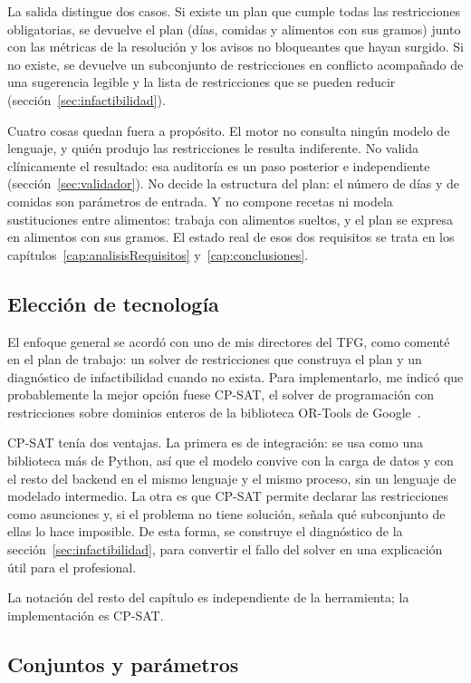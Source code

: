 La salida distingue dos casos. Si existe un plan que cumple todas las restricciones obligatorias, se devuelve el plan (días, comidas y alimentos con sus gramos) junto con las métricas de la resolución y los avisos no bloqueantes que hayan surgido. Si no existe, se devuelve un subconjunto de restricciones en conflicto acompañado de una sugerencia legible y la lista de restricciones que se pueden reducir (sección~\ref{sec:infactibilidad}).

Cuatro cosas quedan fuera a propósito. El motor no consulta ningún modelo de lenguaje, y quién produjo las restricciones le resulta indiferente. No valida clínicamente el resultado: esa auditoría es un paso posterior e independiente (sección~\ref{sec:validador}). No decide la estructura del plan: el número de días y de comidas son parámetros de entrada. Y no compone recetas ni modela sustituciones entre alimentos: trabaja con alimentos sueltos, y el plan se expresa en alimentos con sus gramos. El estado real de esos dos requisitos se trata en los capítulos~\ref{cap:analisisRequisitos} y~\ref{cap:conclusiones}.

\subsection{Elección de tecnología}

El enfoque general se acordó con uno de mis directores del TFG, como comenté en el plan de trabajo: un solver de restricciones que construya el plan y un diagnóstico de infactibilidad cuando no exista. Para implementarlo, me indicó que probablemente la mejor opción fuese CP-SAT, el solver de programación con restricciones sobre dominios enteros de la biblioteca OR-Tools de Google~\citep{ortools}.

CP-SAT tenía dos ventajas. La primera es de integración: se usa como una biblioteca más de Python, así que el modelo convive con la carga de datos y con el resto del backend en el mismo lenguaje y el mismo proceso, sin un lenguaje de modelado intermedio. La otra es que CP-SAT permite declarar las restricciones como asunciones y, si el problema no tiene solución, señala qué subconjunto de ellas lo hace imposible. De esta forma, se construye el diagnóstico de la sección~\ref{sec:infactibilidad}, para convertir el fallo del solver en una explicación útil para el profesional.

La notación del resto del capítulo es independiente de la herramienta; la implementación es CP-SAT.

\subsection{Conjuntos y parámetros}

